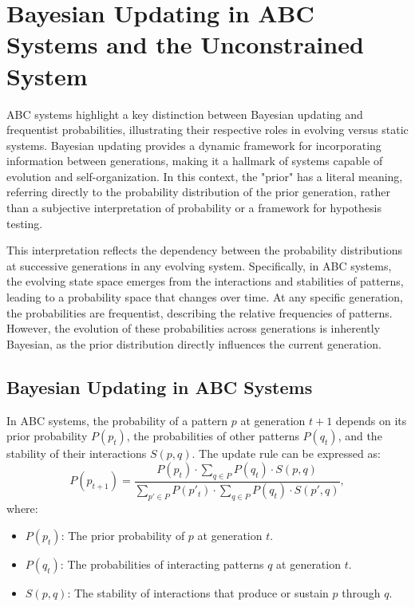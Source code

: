 \documentclass[%
 preprint, linenumbers,
 amsmath,amssymb,
 aps, physrev,
]{revtex4-2}
\begin{document}
\section{Bayesian Updating in ABC Systems and the Unconstrained System}

ABC systems highlight a key distinction between Bayesian \cite{mcgrayne2011theory} updating and frequentist probabilities, illustrating their respective roles in evolving versus static systems. Bayesian updating provides a dynamic framework for incorporating information between generations, making it a hallmark of systems capable of evolution and self-organization. In this context, the "prior" has a literal meaning, referring directly to the probability distribution of the prior generation, rather than a subjective interpretation of probability or a framework for hypothesis testing.

This interpretation reflects the dependency between the probability distributions at successive generations in any evolving system. Specifically, in ABC systems, the evolving state space emerges from the interactions and stabilities of patterns, leading to a probability space that changes over time. At any specific generation, the probabilities are frequentist, describing the relative frequencies of patterns. However, the evolution of these probabilities across generations is inherently Bayesian, as the prior distribution directly influences the current generation.

\subsection{Bayesian Updating in ABC Systems}

In ABC systems, the probability of a pattern \( p \) at generation \( t+1 \) depends on its prior probability \( P(p_t) \), the probabilities of other patterns \( P(q_t) \), and the stability of their interactions \( S(p, q) \). The update rule can be expressed as:
\[
P(p_{t+1}) = \frac{P(p_t) \cdot \sum_{q \in P} P(q_t) \cdot S(p, q)}{\sum_{p' \in P} P(p'_t) \cdot \sum_{q \in P} P(q_t) \cdot S(p', q)},
\]
where:
\begin{itemize}
    \item \( P(p_t) \): The prior probability of \( p \) at generation \( t \).
    \item \( P(q_t) \): The probabilities of interacting patterns \( q \) at generation \( t \).
    \item \( S(p, q) \): The stability of interactions that produce or sustain \( p \) through \( q \).
\end{itemize}
\end{document}
